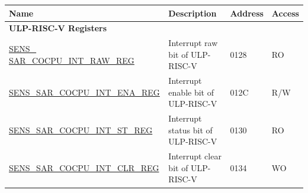 \begin{longtable}{ | p{6cm} | p{7.2cm} | p{1.3cm} | p{1cm} | }
\hline\rowcolor{lightgray}
Name & Description &  Address & Access \\ \hline
\endhead
\multicolumn{4}{|l|}{\textbf{ULP-RISC-V Registers}} \\ \hline
\hyperref[regdesc:SENS SARCOCPUINTRAWREG]{SENS\_ SAR\_COCPU\_INT\_RAW\_REG} & Interrupt raw bit of ULP-RISC-V& \hexprefix{}0128 & RO \\ \hline
\hyperref[regdesc:SENSSARCOCPUINTENAREG]{SENS\_SAR\_COCPU\_INT\_ENA\_REG} & Interrupt enable bit of ULP-RISC-V & \hexprefix{}012C & R/W \\ \hline
\hyperref[regdesc:SENSSARCOCPUINTSTREG]{SENS\_SAR\_COCPU\_INT\_ST\_REG} & Interrupt status bit of ULP-RISC-V & \hexprefix{}0130 & RO \\ \hline
\hyperref[regdesc:SENSSARCOCPUINTCLRREG]{SENS\_SAR\_COCPU\_INT\_CLR\_REG} & Interrupt clear bit of ULP-RISC-V & \hexprefix{}0134 & WO \\ \hline
\end{longtable}

